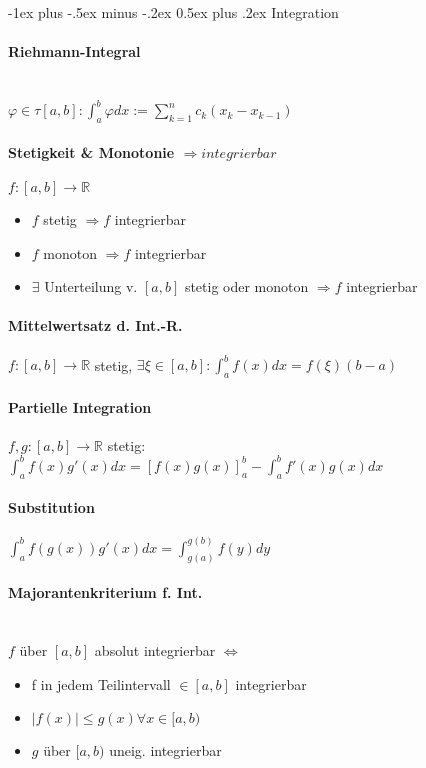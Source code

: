 \documentclass[paper=a3,paper=landscape, fontsize=9pt,DIV=25]{scrartcl}
\makeatletter
\newcommand{\real}{{\mathbb{R}}}
\renewcommand{\section}{\@startsection{section}{1}{0mm}%
  {-1ex plus -.5ex minus -.2ex}%
  {0.5ex plus .2ex}%
  {\color{blue}\normalfont\large\bfseries}}
\makeatother
\begin{document}
\begin{multicols*}{4}
  \section{Integration}


  \paragraph{Riehmann-Integral}\hspace{0pt} \\
  $\varphi \in \tau [a,b]: \int_{a}^{b}\varphi dx := \sum_{k=1}^{n}c_k(x_k-x_{k-1})$


  \paragraph{Stetigkeit \& Monotonie $\Rightarrow integrierbar$} $f: [a,b] \rightarrow \real$
  \begin{itemize}
  \item $f$ stetig $\Rightarrow f$ integrierbar
  \item $f$ monoton $\Rightarrow f$ integrierbar
  \item $\exists$ Unterteilung v. $[a,b]$ stetig oder monoton $\Rightarrow f$ integrierbar
  \end{itemize}


  \paragraph{Mittelwertsatz d. Int.-R.}
  $f:[a,b] \rightarrow \real$ stetig, $\exists \xi \in [a,b]: \int_{a}^{b}f(x)dx=f(\xi)(b-a)$


  \paragraph{Partielle Integration}
  $f,g: [a,b] \rightarrow \real$ stetig: $\int_{a}^{b}f(x)g'(x)dx=[f(x)g(x)]_a^b-\int_{a}^{b}f'(x)g(x) dx$


  \paragraph{Substitution}
  $\int_{a}^{b}f(g(x))g'(x)dx=\int_{g(a)}^{g(b)}f(y)dy$


  \paragraph{Majorantenkriterium f. Int.}\hspace{0pt} \\
  $f$ über $[a,b]$ absolut integrierbar $\Leftrightarrow$
  \begin{itemize}
  \item f in jedem Teilintervall $\in [a,b]$ integrierbar
  \item $\lvert f(x) \rvert \leq g(x) \forall x \in [a,b)$
  \item $g$ über $[a,b)$ uneig. integrierbar
  \end{itemize}



\end{multicols*}
\end{document}
